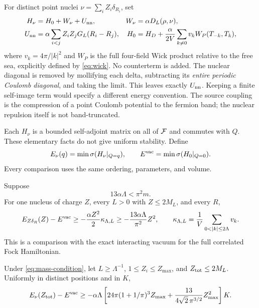 For distinct point nuclei $\nu=\sum_iZ_i\delta_{R_i}$, set
\begin{align}
H_\nu&=H_0+W_\nu+U_{\rm nn},&
W_\nu&=\alpha D_L(\rho,\nu),\\
U_{\rm nn}&=\alpha\sum_{i<j}Z_iZ_jG_L(R_i-R_j),&
H_0&=H_D+\frac{\alpha}{2V}\sum_{k\ne0}v_kW_P(T_{-k},T_k),
\label{eq:model}
\end{align}
where $v_k=4\pi/|k|^2$ and $W_P$ is the full four-field Wick product
relative to the free sea, explicitly defined by \eqref{eq:wick}.
No counterterm is added. The nuclear diagonal is removed by mollifying
each delta, subtracting its \emph{entire periodic Coulomb diagonal},
and taking the limit. This leaves exactly $U_{\rm nn}$.
Keeping a finite self-image term would specify a different energy convention.
The source coupling is the compression of a point Coulomb potential
to the fermion band; the nuclear repulsion itself is not band-truncated.

Each $H_\nu$ is a bounded self-adjoint matrix on all of $\mathcal F$ and
commutes with $Q$. These elementary facts do not give uniform stability.
Define
\[
E_\nu(q)=\min\sigma(H_\nu|_{Q=q}),\qquad
E^{\mathrm{vac}}=\min\sigma(H_0|_{Q=0}).
\]
Every comparison uses the same ordering, parameters, and volume.

\begin{theorem}\label{thm:one}
Suppose
\begin{equation}
13\alpha\Lambda<\pi^2m.
\label{eq:mass-condition}
\end{equation}
For one nucleus of charge $Z$, every $L>0$ with $Z\le2M_L$, and every $R$,
\begin{equation}
E_{Z\delta_R}(Z)-E^{\vac}\ge-\frac{\alpha Z^2}{2}\kappa_{\Lambda,L}
\ge-\frac{13\alpha\Lambda}{\pi^2}Z^2,\qquad
\kappa_{\Lambda,L}=\frac1V\sum_{0<|k|\le2\Lambda}v_k.
\label{eq:one-bound}
\end{equation}
This is a comparison with the exact interacting vacuum for the full
correlated Fock Hamiltonian.
\end{theorem}

\begin{theorem}\label{thm:many}
Under \eqref{eq:mass-condition}, let $L\ge\Lambda^{-1}$,
$1\le Z_i\le Z_{\max}$, and $Z_{\rm tot}\le2M_L$.
Uniformly in distinct positions and in $K$,
\begin{equation}
E_\nu(Z_{\rm tot})-E^{\mathrm{vac}}\ge
-\alpha\Lambda\left[
24\pi(1+1/\pi)^3Z_{\max}
+\frac{13}{4\sqrt2\,\pi^{3/2}}Z_{\max}^2
\right]K.
\label{eq:many-bound}
\end{equation}
\end{theorem}

